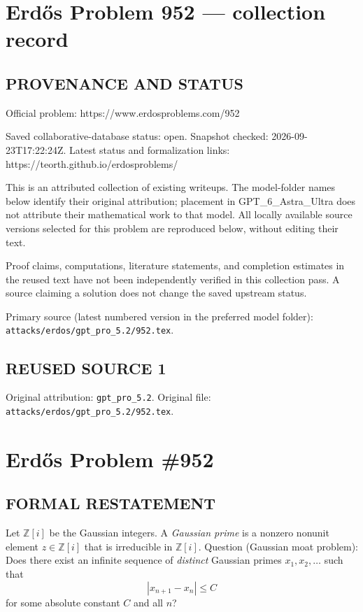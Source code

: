 \section*{Erd\H{o}s Problem 952 --- collection record}

\subsection*{PROVENANCE AND STATUS}
Official problem: https://www.erdosproblems.com/952

Saved collaborative-database status: open.
Snapshot checked: 2026-09-23T17:22:24Z.
Latest status and formalization links: https://teorth.github.io/erdosproblems/

This is an attributed collection of existing writeups. The model-folder names below identify their original attribution; placement in GPT\_6\_Astra\_Ultra does not attribute their mathematical work to that model. All locally available source versions selected for this problem are reproduced below, without editing their text.

Proof claims, computations, literature statements, and completion estimates in the reused text have not been independently verified in this collection pass. A source claiming a solution does not change the saved upstream status.

Primary source (latest numbered version in the preferred model folder): \texttt{attacks/erdos/gpt\_pro\_5.2/952.tex}.

\subsection*{REUSED SOURCE 1}
Original attribution: \texttt{gpt\_pro\_5.2}.
Original file: \texttt{attacks/erdos/gpt\_pro\_5.2/952.tex}.


\section*{Erd\H{o}s Problem \#952}

\subsection*{FORMAL RESTATEMENT}
Let $\mathbb Z[i]$ be the Gaussian integers. A \emph{Gaussian prime} is a nonzero nonunit element $z\in\mathbb Z[i]$ that is irreducible in $\mathbb Z[i]$.
Question (Gaussian moat problem):
Does there exist an infinite sequence of \emph{distinct} Gaussian primes $x_1,x_2,\dots$ such that
\[
|x_{n+1}-x_n|\le C
\]
for some absolute constant $C$ and all $n$?

